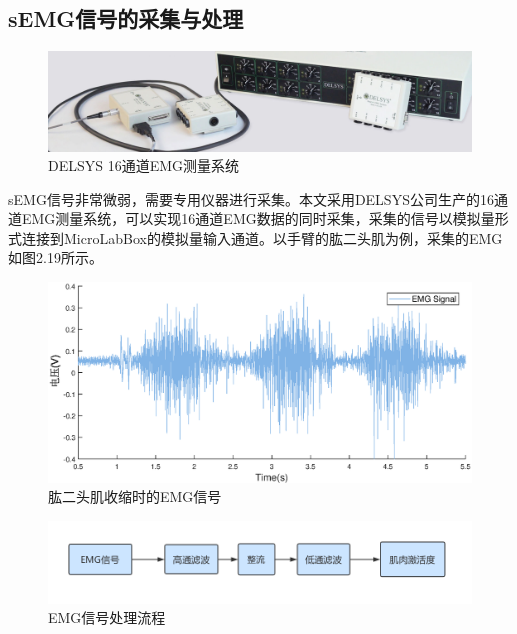 \subsection{sEMG信号的采集与处理}

\begin{figure}[htb]
    \includegraphics[width=16cm]{fig/f44.jpg}
    \caption{DELSYS 16通道EMG测量系统}
    \label{fig:mark}
\end{figure}

sEMG信号非常微弱，需要专用仪器进行采集。本文采用DELSYS公司生产的16通道EMG测量系统，可以实现16通道EMG数据的同时采集，采集的信号以模拟量形式连接到MicroLabBox的模拟量输入通道。以手臂的肱二头肌为例，采集的EMG如图2.19所示。

\begin{figure}[htb]
    \includegraphics[width=17cm]{fig/f45.eps}
    \caption{肱二头肌收缩时的EMG信号}
    \label{fig:mark}
\end{figure}

\begin{figure}[htb]
    \includegraphics[width=16cm]{fig/f47.png}
    \caption{EMG信号处理流程}
    \label{fig:mark}
\end{figure}

